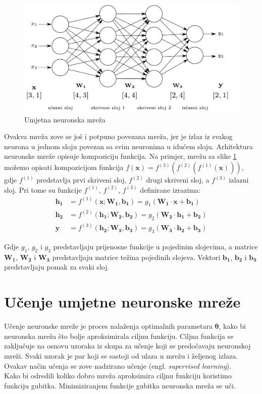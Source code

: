 \documentclass[times, utf8, zavrsni, numeric]{fer}
\renewcommand{\vec}[1]{\mathbf{#1}}
\begin{document}
\begin{figure}[htb]
	\centering
	\includegraphics[scale=0.65]{ann.pdf}
	\caption{Umjetna neuronska mreža}
	\label{fig:ann}
\end{figure}

Ovakva mreža zove se još i 
potpuno povezana mreža, jer je izlaz iz svakog neurona u jednom sloju povezan 
sa svim neuronima u idućem sloju. Arhitektura neuronske mreže opisuje
kompoziciju funkcija. Na primjer, mrežu sa slike \ref{fig:ann} možemo opisati 
kompozicijom funkcija $f(\vec{x}) = f^{(3)}(f^{(2)}(f^{(1)}(\vec{x})))$, gdje
$f^{(1)}$ predstavlja prvi skriveni sloj, $f^{(2)}$ drugi skriveni sloj, a
$f^{(3)}$ izlazni sloj. Pri tome su funkcije $f^{(1)}$, $f^{(2)}$, $f^{(3)}$
definirane izrazima: 
\begin{align}
	\vec{h_1} &= f^{(1)}(\vec{x};\vec{W_1}, \vec{b_1}) = g_1(\vec{W_1}\cdot
	\vec{x} +\vec{b_1}) \\
	\vec{h_2} &= f^{(2)}(\vec{h_1};\vec{W_2}, \vec{b_2})= g_2(\vec{W_2}\cdot
	\vec{h_1} +\vec{b_2}) \\
	\vec{y} &= f^{(3)}(\vec{h_2};\vec{W_3}, \vec{b_3}) = g_3(\vec{W_3}\cdot
	\vec{h_2} +\vec{b_3})
\end{align}

Gdje $g_1$, $g_2$ i $g_3$ predstavljaju prijenosne funkcije u pojedinim 
slojevima, a matrice $\vec{W_1}$, $\vec{W_2}$ i $\vec{W_3}$ predstavljaju
matrice težina pojedinih slojeva. Vektori $\vec{b_1}$, $\vec{b_2}$ i $\vec{b_3}$
predstavljaju pomak za svaki sloj.

\section{Učenje umjetne neuronske mreže}
Učenje neuronske mreže je proces nalaženja optimalnih parametara $\pmb{\theta}$,
kako bi neuronska mreža što bolje aproksimirala ciljnu funkciju. Ciljna funkcija
se zaključuje na osnovu uzoraka iz skupa za učenje koji se predočavaju 
neuronskoj mreži. Svaki uzorak je par koji se sastoji od ulaza u mrežu i
željenog izlaza. Ovakav način učenja se zove nadzirano učenje (engl. 
\textit{supervised learning}).
\\\indent
Kako bi odredili koliko dobro mreža aproksimira ciljnu funkciju koristimo
funkciju gubitka. Minimiziranjem funkcije gubitka neuronska mreža se uči.
\end{document}
